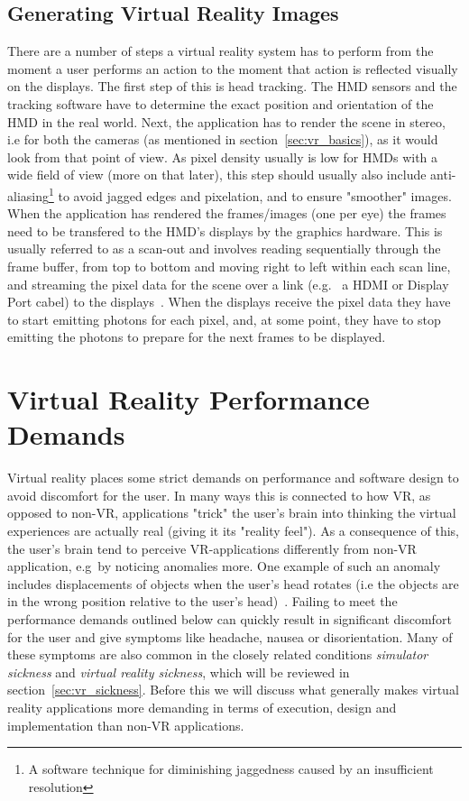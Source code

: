 \subsection*{Generating Virtual Reality Images}
There are a number of steps a virtual reality system has to perform from the moment a user performs an action to the moment that action is reflected visually on the displays.
The first step of this is head tracking. The HMD sensors and the tracking software have to determine the exact position and orientation of the HMD in the 
real world. Next, the application has to render the scene in stereo, i.e for both the cameras (as mentioned in section~\vref{sec:vr_basics}), 
as it would look from that point of view. As pixel density usually is low for HMDs with a wide field of view (more on that later), this step should usually 
also include anti-aliasing\footnote{A software technique for diminishing jaggedness caused by an insufficient resolution} to avoid jagged edges and pixelation, 
and to ensure "smoother" images. When the application has rendered the frames/images (one per eye)
the frames need to be transfered to the HMD's displays by the graphics hardware. This is usually referred to as a scan-out and involves reading sequentially through the 
frame buffer, from top to bottom and moving right to left within each scan line, and streaming the pixel data for the scene over a link (e.g.~ a HDMI or Display Port cabel) 
to the displays~\citep{Abrash2012}. When the displays receive the pixel data they have to start emitting photons for each pixel, and, at some point, they 
have to stop emitting the photons to prepare for the next frames to be displayed. 


\section{Virtual Reality Performance Demands}
Virtual reality places some strict demands on performance and software design to avoid discomfort for the user. In many ways this is connected to how VR, 
as opposed to non-VR, applications "trick" the user's brain into thinking the virtual experiences are actually real (giving it its "reality feel"). 
As a consequence of this, the user's brain tend to perceive VR-applications differently from non-VR application, e.g~by noticing anomalies more. 
One example of such an anomaly includes displacements of objects when the user's head rotates (i.e the objects are in the wrong position 
relative to the user's head)~\citep{Abrash2012}. 
Failing to meet the performance demands outlined below can quickly result in significant discomfort for the user and give symptoms like 
headache, nausea or disorientation. Many of these symptoms are also common in the closely related conditions \textit{simulator sickness} and \textit{virtual reality sickness},
which will be reviewed in section~\vref{sec:vr_sickness}.  
Before this we will discuss what generally makes virtual reality applications more demanding in terms of execution, design and implementation than non-VR applications.



